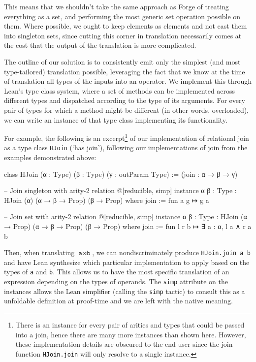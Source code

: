This means that we shouldn't take the same approach as Forge of treating everything as a set, and performing the most generic set operation possible on them. Where possible, we ought to keep elements as elements and not cast them into singleton sets, since cutting this corner in translation necessarily comes at the cost that the output of the translation is more complicated. 

The outline of our solution is to consistently emit only the simplest (and most type-tailored) translation possible, leveraging the fact that we know at the time of translation all types of the inputs into an operator. We implement this through Lean's type class system, where a set of methods can be implemented across different types and dispatched according to the type of its arguments. For every pair of types for which a method might be different (in other words, overloaded), we can write an instance of that type class implementing its functionality. 

For example, the following is an excerpt\footnote{There is an instance for every pair of arities and types that could be passed into a join, hence there are many more instances than shown here. However, these implementation details are obscured to the end-user since the join function \texttt{HJoin.join} will only resolve to a single instance.} of our implementation of relational join as a type class \texttt{HJoin} (`has join'), following our implementations of join from the examples demonstrated above: 

\begin{leanimpl*}
class HJoin (α : Type) (β : Type) (γ : outParam Type) :=
  (join : α → β → γ)

-- Join singleton with arity-2 relation
@[reducible, simp] instance {α β : Type} : HJoin (α) (α → β → Prop) (β → Prop) where
  join := fun a g ↦ g a

-- Join set with arity-2 relation
@[reducible, simp] instance {α β : Type} : HJoin (α → Prop) (α → β → Prop) (β → Prop) where
  join := fun l r b ↦ ∃ a : α, l a ∧ r a b
\end{leanimpl*}

Then, when translating $\texttt{a}\bowtie \texttt{b}$, we can nondiscriminately produce \texttt{HJoin.join a b} and have Lean synthesize which particular implementation to apply based on the types of \texttt{a} and \texttt{b}. This allows us to have the most specific translation of an expression depending on the types of operands. The \texttt{simp} attribute on the instances allows the Lean simplifier (calling the \texttt{simp} tactic) to consult this as a unfoldable definition at proof-time and we are left with the native meaning.

